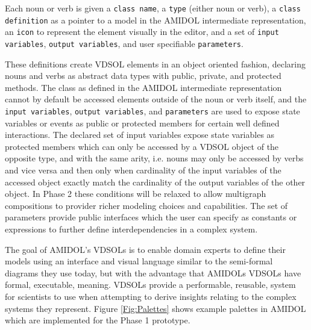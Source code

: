 \documentclass[11pt]{article}
\newcommand{\amidol}{\textsc{AMIDOL}}
\begin{document}
Each noun or verb is given a \texttt{class name}, a \texttt{type} (either noun or verb), a \texttt{class definition} as a pointer to a model in the \amidol{} intermediate representation, an \texttt{icon} to represent the element visually in the editor, and a set of \texttt{input variables}, \texttt{output variables}, and user specifiable \texttt{parameters}.

These definitions create VDSOL elements in an object oriented fashion, declaring nouns and verbs as abstract data types with public, private, and protected methods.  The class as defined in the \amidol{} intermediate representation cannot by default be accessed elements outside of the noun or verb itself, and the \texttt{input variables}, \texttt{output variables}, and \texttt{parameters} are used to expose state variables or events as public or protected members for certain well defined interactions.  The declared set of input variables expose state variables as protected members which can only be accessed by a VDSOL object of the opposite type, and with the same arity, i.e. nouns may only be accessed by verbs and vice versa and then only when cardinality of the input variables of the accessed object exactly match the cardinality of the output variables of the other object.  In Phase 2 these conditions will be relaxed to allow multigraph compositions to provider richer modeling choices and capabilities.  The set of parameters provide public interfaces which the user can specify as constants or expressions to further define interdependencies in a complex system.

The goal of \amidol{}'s VDSOLs is to enable domain experts to define their models using an interface and visual language similar to the semi-formal diagrams they use today, but with the advantage that \amidol{}s VDSOLs have formal, executable, meaning.  VDSOLs provide a performable, reusable, system for scientists to use when attempting to derive insights relating to the complex systems they represent.  Figure \ref{Fig:Palettes} shows example palettes in \amidol{} which are implemented for the Phase 1 prototype.
\end{document}

